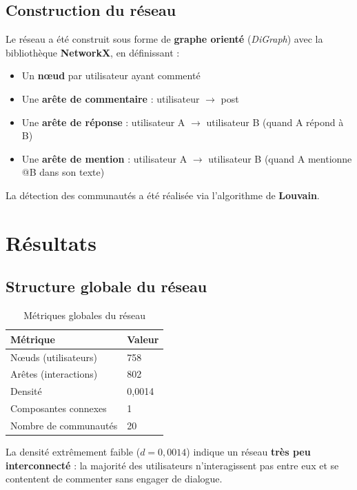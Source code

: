 \documentclass[12pt, a4paper]{article}
\begin{document}
\subsection{Construction du réseau}

Le réseau a été construit sous forme de \textbf{graphe orienté} (\textit{DiGraph})
avec la bibliothèque \textbf{NetworkX}, en définissant :

\begin{itemize}
    \item Un \textbf{nœud} par utilisateur ayant commenté
    \item Une \textbf{arête de commentaire} : utilisateur $\rightarrow$ post
    \item Une \textbf{arête de réponse} : utilisateur A $\rightarrow$ utilisateur B
          (quand A répond à B)
    \item Une \textbf{arête de mention} : utilisateur A $\rightarrow$ utilisateur B
          (quand A mentionne @B dans son texte)
\end{itemize}

La détection des communautés a été réalisée via l'algorithme de \textbf{Louvain}.

\section{Résultats}

\subsection{Structure globale du réseau}

\begin{table}[h!]
\centering
\begin{tabular}{@{}ll@{}}
\toprule
\textbf{Métrique} & \textbf{Valeur} \\
\midrule
Nœuds (utilisateurs)   & 758 \\
Arêtes (interactions)  & 802 \\
Densité                & 0,0014 \\
Composantes connexes   & 1 \\
Nombre de communautés  & 20 \\
\bottomrule
\end{tabular}
\caption{Métriques globales du réseau}
\end{table}

La densité extrêmement faible ($d = 0{,}0014$) indique un réseau \textbf{très peu
interconnecté} : la majorité des utilisateurs n'interagissent pas entre eux et se
contentent de commenter sans engager de dialogue.
\end{document}
